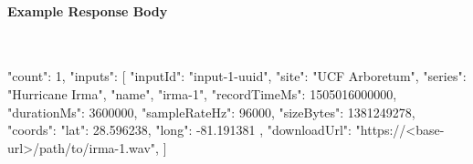 \paragraph{Example Response Body} \mbox{}\\[\codeheaderspace]
\begin{jsoncode}
{
  "count": 1,
  "inputs": [
    {
      "inputId": "input-1-uuid",
      "site": "UCF Arboretum",
      "series": "Hurricane Irma",
      "name", "irma-1",
      "recordTimeMs": 1505016000000,
      "durationMs": 3600000,
      "sampleRateHz": 96000,
      "sizeBytes": 1381249278,
      "coords": {
        "lat": 28.596238,
        "long": -81.191381
      },
      "downloadUrl": "https://<base-url>/path/to/irma-1.wav",
    }
  ]
}
\end{jsoncode}
